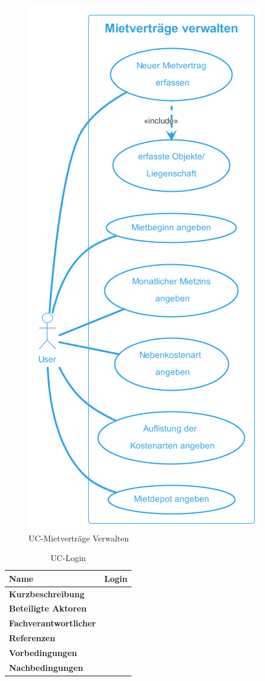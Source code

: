 \begin{figure}[H]
  \begin{center}
    \includegraphics[width=0.45\linewidth]{content/diagrams/out/usecase/mietverträgeVerwalten/MietverträgeVerwalten.png}
    \caption{UC-Mietverträge Verwalten}
  \end{center}
  \label{MietvertraegeVerwalten}
\end{figure}

\begin{table}[H]
  \centering
  \settowidth{}
  \setlength\extrarowheight{2pt}
  \begin{tabulary}{1.0\textwidth}{|a|m{12cm}|}
    \hline
    \textbf{Name}& Login\\
    \hline 
    \textbf{Kurzbeschreibung} & \\
    \hline
    \textbf{Beteiligte Aktoren} & \\
    \hline
    \textbf{Fachverantwortlicher} & \\
    \hline
    \textbf{Referenzen} & \\
    \hline
    \textbf{Vorbedingungen} & \\
    \hline
    \textbf{Nachbedingungen} & \\
    \hline
  \end{tabulary}
  \caption{UC-Login}
\end{table}

